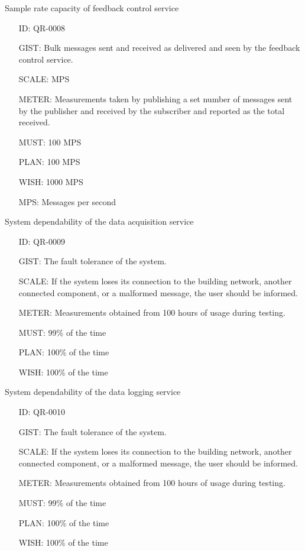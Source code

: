        Sample rate capacity of feedback control service

        \begin{itemize}
          \setlength{\itemindent}{.5in}
          \itemsep .15em
          \item[ID:] QR-0008
          \item[GIST:] Bulk messages sent and received as delivered and seen
            by the feedback control service.
          \item[SCALE:] MPS
          \item[METER:] Measurements taken by publishing a set number of
            messages sent by the publisher and received by the subscriber and
            reported as the total received.
          \item[MUST:] 100 MPS
          \item[PLAN:] 100 MPS
          \item[WISH:] 1000 MPS
          \item[MPS:] Messages per second
        \end{itemize}

        System dependability of the data acquisition service

        \begin{itemize}
          \setlength{\itemindent}{.5in}
          \itemsep .15em
          \item[ID:] QR-0009
          \item[GIST:] The fault tolerance of the system.
          \item[SCALE:] If the system loses its connection to the building
            network, another connected component, or a malformed message, the
            user should be informed.
          \item[METER:] Measurements obtained from 100 hours of usage during
            testing.
          \item[MUST:] 99\% of the time
          \item[PLAN:] 100\% of the time
          \item[WISH:] 100\% of the time
        \end{itemize}

        System dependability of the data logging service

        \begin{itemize}
          \setlength{\itemindent}{.5in}
          \itemsep .15em
          \item[ID:] QR-0010
          \item[GIST:] The fault tolerance of the system.
          \item[SCALE:] If the system loses its connection to the building
            network, another connected component, or a malformed message, the
            user should be informed.
          \item[METER:] Measurements obtained from 100 hours of usage during
            testing.
          \item[MUST:] 99\% of the time
          \item[PLAN:] 100\% of the time
          \item[WISH:] 100\% of the time
        \end{itemize}


